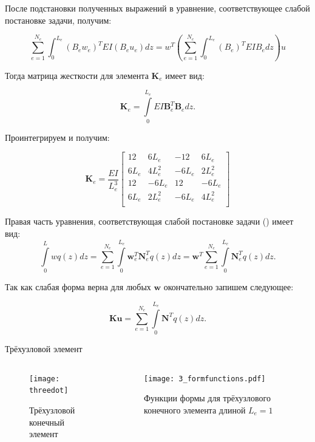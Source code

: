 \documentclass[7pt]{beamer}
\numberwithin{equation}{section}
\begin{document}
\begin{frame}
	После подстановки полученных выражений в уравнение, соответствующее слабой постановке задачи, получим:
	\begin{block}{}
		\[
			\sum_{e=1}^{N_{e}} \int_{0}^{L_e}(B_e w_e)^{T}EI(B_e u_e)dz=w^{T}\left(\sum_{e=1}^{N_e}\int_{0}^{L_e}(B_e)^{T}EI B_e dz\right)u
		\]
	\end{block}

	Тогда матрица жесткости для элемента $\textbf{K}_e$ имеет вид:
	\begin{block}{}
		\[\textbf{K}_e=\int\limits_{0}^{L_e}EI\textbf{B}_e^{T}\textbf{B}_e dz.\]
	\end{block}

	Проинтегрируем и получим:
	\begin{block}{}
		\[\textbf{K}_e=\frac{EI}{L_e^{3}}
		\left[
		\begin{array}{cccc}
			12 & 6L_e & -12 & 6L_e\\
			6L_e & 4L_e^{2} & -6L_e & 2L_e^{2}\\
				12 & -6L_e & 12 & -6L_e\\
				6L_e & 2L_e^{2} & -6L_e & 4L_e^{2}\\
		\end{array}
		\right]
		\]
	\end{block}
\end{frame}

\begin{frame}
	Правая часть уравнения, соответствующая слабой постановке задачи () имеет вид:
	\[
		\int\limits_{0}^{L}wq(z)dz=\sum\limits_{e=1}^{N_e}\int\limits_{0}^{L_e}\textbf{w}_e^{T}\textbf{N}^T_e q(z)dz=\textbf{w}^{T}\sum\limits_{e=1}^{N_e} \int\limits_{0}^{L_e}\textbf{N}_e^{T}q(z)dz.
		\]

	Так как слабая форма верна для любых $\textbf{w}$  окончательно запишем следующее:
	\begin{block}{}
		\[\textbf{Ku}=\sum\limits_{e=1}^{N_e}\int\limits_{0}^{L_e}\textbf{N}^{T}q(z)dz.\]
	\end{block}
\end{frame}

\begin{frame}{Трёхузловой элемент}
	\begin{columns}
		\begin{column}{0.58\textwidth}
			\begin{figure}[H]
				\centering
				\texttt{[image: threedot]}
				\caption{Трёхузловой конечный элемент}
				\label{fig:threedot}
			\end{figure}
		\end{column}
		\begin{column}{0.58\textwidth}
			\begin{figure}[H]
				\centering
				\texttt{[image: 3\_formfunctions.pdf]}
				\caption{Функции формы для трёхузлового конечного элемента длиной $L_{e}=1$}
				\label{fig:3_formfunctions}
			\end{figure}
		\end{column}
	\end{columns}
\end{frame}
\end{document}
